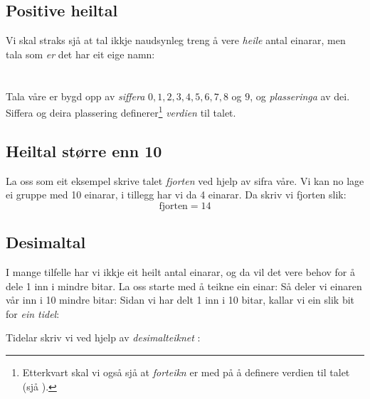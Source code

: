 \subsection*{Positive heiltal}
Vi skal straks sjå at tal ikkje naudsynleg treng å vere \textsl{heile} antal einarar, men tala som \textsl{er} det har eit eige namn:\regv


\newpage
\section{\talsifverd}
Tala våre er bygd opp av \textit{siffera} $ 0, 1, 2 , 3, 4, 5, 6, 7, 8 $ og $ 9 $, og \textsl{plasseringa} av dei. Siffera og deira plassering definerer\footnote{Etterkvart skal vi også sjå at \textit{forteikn} er med på å definere verdien til talet (sjå ).} \textit{verdien}  til talet.
\subsection*{Heiltal større enn 10}
La oss som eit eksempel skrive talet \textsl{fjorten} ved hjelp av sifra våre.
Vi kan no lage ei gruppe med 10 einarar, i tillegg har vi da 4 einarar. Da skriv vi fjorten slik:
\[ \text{fjorten}=14 \]
\vsk

\newpage
\subsection*{Desimaltal}
I mange tilfelle har vi ikkje eit heilt antal einarar, og da vil det vere behov for å dele 1 inn i mindre bitar. La oss starte med å teikne ein einar:
Så deler vi einaren vår inn i 10 mindre bitar:
Sidan vi har delt 1 inn i 10 bitar, kallar vi ein slik bit for \textit{ein tidel}:
\begin{comment}
\eks{\vs
	\fig{maal2}
	\fig{des2}
}\vsk
\end{comment}
Tidelar skriv vi ved hjelp av  \textit{desimalteiknet} \sym{,}  :
\regv
{}
\newpage
